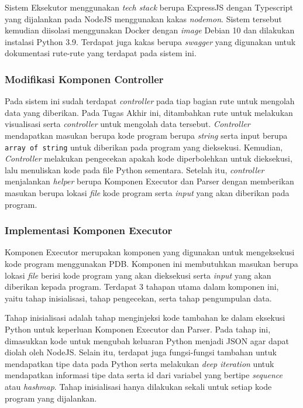 Sistem Eksekutor menggunakan \textit{tech stack} berupa ExpressJS dengan Typescript yang dijalankan pada NodeJS menggunakan kakas \textit{nodemon}. Sistem tersebut kemudian diisolasi menggunakan Docker dengan \textit{image} Debian 10 dan dilakukan instalasi Python 3.9. Terdapat juga kakas berupa \textit{swagger} yang digunakan untuk dokumentasi rute-rute yang terdapat pada sistem ini.

\subsubsection{Modifikasi Komponen Controller}
Pada sistem ini sudah terdapat \textit{controller} pada tiap bagian rute untuk mengolah data yang diberikan. Pada Tugas Akhir ini, ditambahkan rute untuk melakukan visualisasi serta \textit{controller} untuk mengolah data tersebut. \textit{Controller} mendapatkan masukan berupa kode program berupa \textit{string} serta input berupa \verb|array of string| untuk diberikan pada program yang dieksekusi. Kemudian, \textit{Controller} melakukan pengecekan apakah kode diperbolehkan untuk dieksekusi, lalu menuliskan kode pada file Python sementara. Setelah itu, \textit{controller} menjalankan \textit{helper} berupa Komponen Executor dan Parser dengan memberikan masukan berupa lokasi \textit{file} kode program serta \textit{input} yang akan diberikan pada program.


\subsubsection{Implementasi Komponen Executor}
Komponen Executor merupakan komponen yang digunakan untuk mengeksekusi kode program menggunakan PDB. Komponen ini membutuhkan masukan berupa lokasi \textit{file} berisi kode program yang akan dieksekusi serta \textit{input} yang akan diberikan kepada program. Terdapat 3 tahapan utama dalam komponen ini, yaitu tahap inisialisasi, tahap pengecekan, serta tahap pengumpulan data.

Tahap inisialisasi adalah tahap menginjeksi kode tambahan ke dalam eksekusi Python untuk keperluan Komponen Executor dan Parser. Pada tahap ini, dimasukkan kode untuk mengubah keluaran Python menjadi JSON agar dapat diolah oleh NodeJS. Selain itu, terdapat juga fungsi-fungsi tambahan untuk mendapatkan tipe data pada Python serta melakukan \textit{deep iteration} untuk mendapatkan informasi tipe data serta id dari variabel yang bertipe \textit{sequence} atau \textit{hashmap}. Tahap inisialisasi hanya dilakukan sekali untuk setiap kode program yang dijalankan.


